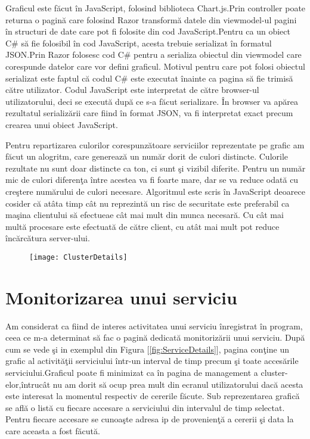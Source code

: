 \documentclass[a4paper,12pt]{report}
\let\oldref\ref
\renewcommand{\ref}[1]{[\oldref{#1}]}
\begin{document}
Graficul este f\u acut \^in JavaScript, folosind biblioteca
Chart.js.Prin controller poate returna o pagin\u a care folosind Razor transform\u a 
datele din viewmodel-ul pagini \^in structuri de date care pot fi folosite 
din cod JavaScript.Pentru ca un obiect C\# s\u a fie folosibil \^in cod JavaScript, acesta trebuie 
serializat \^in formatul JSON.Prin Razor folosesc cod C\# pentru a serializa obiectul din viewmodel care corespunde datelor 
care vor defini graficul. Motivul pentru care pot folosi obiectul serializat este faptul c\u a codul C\# este executat \^inainte ca 
pagina s\u a fie trimis\u a c\u atre utilizator. Codul JavaScript este interpretat de c\u atre browser-ul utilizatorului, deci 
se execut\u a dup\u a ce s-a f\u acut serializare. \^In browser va ap\u area rezultatul serializ\u arii care fiind \^in format JSON,
va fi interpretat exact precum crearea unui obiect JavaScript.

Pentru repartizarea culorilor corespunz\u atoare serviciilor reprezentate pe grafic am f\u acut un alogritm,
care genereaz\u a un num\u ar dorit de culori distincte. Culorile rezultate nu sunt doar distincte ca ton, ci 
sunt \c si vizibil diferite. Pentru un num\u ar mic de culori diferen\c ta \^intre acestea va fi foarte mare, dar se 
va reduce odat\u a cu cre\c stere num\u arului de culori necesare. Algoritmul este scris \^in JavaScript deoarece 
cosider c\u a at\^ata timp c\^at nu reprezint\u a un risc de securitate este preferabil ca ma\c sina clientului 
s\u a efectueae c\^at mai mult din munca necesar\u a. Cu c\^at mai mult\u a procesare este efectuat\u a de c\u atre client,
cu at\^at mai mult pot reduce \^inc\u arc\u atura server-ului.  

\begin{figure}[!htb]
	\texttt{[image: ClusterDetails]}
	\label{fig:ClusterDetails}
\end{figure}

\section{Monitorizarea unui serviciu}

Am considerat ca fiind de interes activitatea unui serviciu \^inregistrat \^in program,
ceea ce m-a determinat s\u a fac o pagin\u a dedicat\u a monitoriz\u arii unui serviciu.
Dup\u a cum se vede \c si in exemplul din Figura  \ref{fig:ServiceDetails}, pagina con\c tine un 
grafic al activit\u a\c tii serviciului \^intr-un interval de timp precum \c si toate 
acces\u arile serviciului.Graficul poate fi minimizat ca \^in pagina de management a cluster-elor,\^intruc\^at nu am dorit s\u a ocup prea 
mult din ecranul utilizatorului dac\u a acesta este interesat la momentul respectiv de 
cererile f\u acute. Sub reprezentarea grafic\u a se afl\u a o list\u a cu fiecare accesare
a serviciului din intervalul de timp selectat. Pentru fiecare accesare se cunoa\c ste 
adresa ip de provenien\c t\u a a cererii \c si data la care aceasta a fost f\u acut\u a. 
\end{document}
